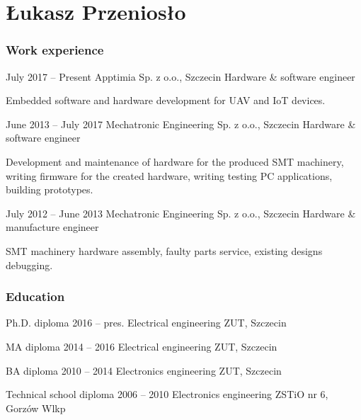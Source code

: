 \documentclass{tccv}
\begin{document}
\part{Łukasz Przeniosło}

\section{Work experience}

\begin{eventlist}

\item{July 2017 -- Present}
     {Apptimia Sp. z o.o., Szczecin}
     {Hardware \& software engineer}
     
Embedded software and hardware development for UAV and IoT devices.

\item{June 2013 -- July 2017}
     {Mechatronic Engineering Sp. z o.o., Szczecin}
     {Hardware \& software engineer}
     
Development and maintenance of hardware for the produced SMT machinery, writing firmware for the created hardware, writing testing PC applications, building prototypes. 

\item{July 2012 -- June 2013}
     {Mechatronic Engineering Sp. z o.o., Szczecin}
     {Hardware \& manufacture engineer}

SMT machinery hardware assembly, faulty parts service, existing designs debugging. 

\end{eventlist}

\section{Education}

\begin{yearlist}

\item[Ph.D. diploma]{2016 -- pres.}
     {Electrical engineering}
     {ZUT, Szczecin}

\item[MA diploma]{2014 -- 2016}
     {Electrical engineering}
     {ZUT, Szczecin}

\item[BA diploma]{2010 -- 2014}
     {Electronics engineering}
     {ZUT, Szczecin}

\item[Technical school diploma]{2006 -- 2010}
     {Electronics engineering}
     {ZSTiO nr 6, Gorzów Wlkp}

\end{yearlist}
\end{document}
